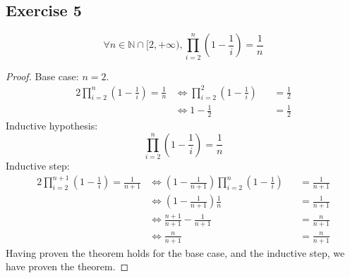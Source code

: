 \documentclass[docid=TP01]{tcom_TP}
\begin{document}
\subsection{Exercise 5}
\begin{theorem}
	\begin{equation*}
		\forall n \in \mathbb{N}\cap[2,+\infty),\prod_{i=2}^{n}{\left(1-\frac{1}{i}\right)}=\frac{1}{n}
	\end{equation*}
\end{theorem}
\begin{proof}
	Base case: $n=2$.
	\begin{alignat*}{2}
		\prod_{i=2}^{n}{\left(1-\frac{1}{i}\right)}=\frac{1}{n}
		&\iff \prod_{i=2}^{2}{\left(1-\frac{1}{i}\right)}&&=\frac{1}{2} \\
		&\iff 1-\frac{1}{2}                              &&=\frac{1}{2}
	\end{alignat*}
	Inductive hypothesis:
	\begin{equation*}
		\prod_{i=2}^{n}{\left(1-\frac{1}{i}\right)}=\frac{1}{n}
	\end{equation*}
	Inductive step:
	\begin{alignat*}{2}
		\prod_{i=2}^{n+1}{\left(1-\frac{1}{i}\right)}=\frac{1}{n+1}
		&\iff \left(1-\frac{1}{n+1}\right)\prod_{i=2}^{n}{\left(1-\frac{1}{i}\right)}&&=\frac{1}{n+1} \\
		&\iff \left(1-\frac{1}{n+1}\right)\frac{1}{n}                                &&=\frac{1}{n+1} \\
		&\iff \frac{n+1}{n+1}-\frac{1}{n+1}                                          &&=\frac{n}{n+1} \\
		&\iff \frac{n}{n+1}                                                          &&=\frac{n}{n+1}
	\end{alignat*}
	Having proven the theorem holds for the base case, and the inductive step, we have proven the theorem.
\end{proof}
\pagebreak
\end{document}
